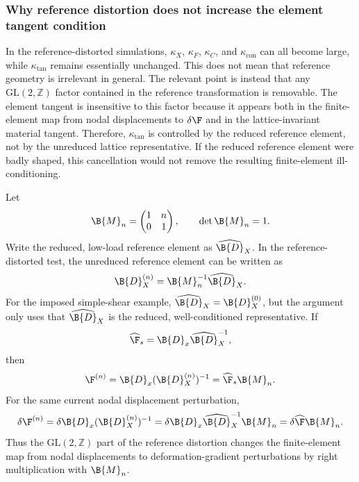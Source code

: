 \subsubsection{Why reference distortion does not increase the element tangent condition}
\label{sec:reference_distortion_tangent_invariance}

In the reference-distorted simulations, $\kappa_X$, $\kappa_F$, $\kappa_C$,
and $\kappa_{\mathrm{con}}$ can all become large, while
$\kappa_{\mathrm{tan}}$ remains essentially unchanged. This does not mean that
reference geometry is irrelevant in general. The relevant point is instead
that any $\mathrm{GL}(2,\mathbb{Z})$ factor contained in the reference
transformation is removable. The element tangent is insensitive to this factor
because it appears both in the finite-element map from nodal displacements to
$\delta\F$ and in the lattice-invariant material tangent. Therefore,
$\kappa_{\mathrm{tan}}$ is controlled by the reduced reference element, not by
the unreduced lattice representative. If the reduced reference element were
badly shaped, this cancellation would not remove the resulting finite-element
ill-conditioning.

Let
\begin{equation}
    \B{M}_n =
    \begin{pmatrix}
        1 & n\\
        0 & 1
    \end{pmatrix},
    \qquad
    \det \B{M}_n = 1 .
\end{equation}
Write the reduced, low-load reference element as $\widehat{\B{D}}_X$. In the
reference-distorted test, the unreduced reference element can be written as
\begin{equation}
    \B{D}^{(n)}_X
    =
    \B{M}_n^{-1}\widehat{\B{D}}_X .
\end{equation}
For the imposed simple-shear example, $\widehat{\B{D}}_X=\B{D}^{(0)}_X$, but
the argument only uses that $\widehat{\B{D}}_X$ is the reduced,
well-conditioned representative. If
\begin{equation}
    \widehat{\F}_s
    =
    \B{D}_x\widehat{\B{D}}_X^{-1},
\end{equation}
then
\begin{equation}
    \F^{(n)}
    =
    \B{D}_x(\B{D}^{(n)}_X)^{-1}
    =
    \widehat{\F}_s\B{M}_n .
\end{equation}
For the same current nodal displacement perturbation,
\begin{equation}
    \delta\F^{(n)}
    =
    \delta\B{D}_x(\B{D}^{(n)}_X)^{-1}
    =
    \delta\B{D}_x\widehat{\B{D}}_X^{-1}\B{M}_n
    =
    \delta\widehat{\F}\B{M}_n .
    \label{eq:reference_distortion_deltaF}
\end{equation}
Thus the $\mathrm{GL}(2,\mathbb{Z})$ part of the reference distortion changes
the finite-element map from nodal displacements to deformation-gradient
perturbations by right multiplication with $\B{M}_n$.

